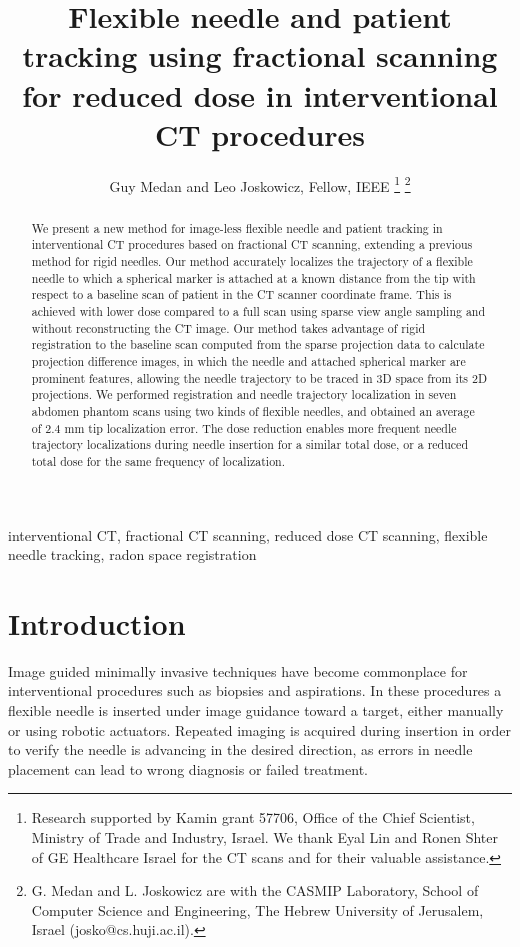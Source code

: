 \documentclass[letterpaper, 11 pt, conference]{ieeeconf} %
\title{\LARGE \bf
Flexible needle and patient tracking using fractional scanning for reduced dose in interventional CT procedures
}
\author{Guy Medan and Leo Joskowicz, Fellow, IEEE%
\thanks{Research supported by Kamin grant 57706, Office of the Chief Scientist, Ministry of Trade and Industry, Israel. We thank Eyal Lin and Ronen Shter of GE Healthcare Israel for the CT scans and for their valuable assistance.}%
\thanks{G. Medan and L. Joskowicz are with the CASMIP Laboratory, School of Computer Science and Engineering, The Hebrew University of Jerusalem, Israel (josko@cs.huji.ac.il).}%
}
\begin{document}
\maketitle
\thispagestyle{plain}
\pagestyle{plain}


\begin{abstract}
We present a new method for image-less flexible needle and patient tracking in interventional CT procedures based on fractional CT scanning, extending a previous method for rigid needles.
Our method accurately localizes the trajectory of a flexible needle to which a spherical marker is attached at a known distance from the tip with respect to a baseline scan of patient in the CT scanner coordinate frame. 
This is achieved with lower dose compared to a full scan using sparse view angle sampling and without reconstructing the CT image.
Our method takes advantage of rigid registration to the baseline scan computed from the sparse projection data to calculate projection difference images, in which the needle and attached spherical marker are prominent features, allowing the needle trajectory to be traced in 3D space from its 2D projections.
We performed registration and needle trajectory localization in seven abdomen phantom scans using two kinds of flexible needles, and obtained an average of 2.4 mm tip localization error.
The dose reduction enables more frequent needle trajectory localizations during needle insertion for a similar total dose, or a reduced total dose for the same frequency of localization.

\end{abstract}

\begin{keywords}
interventional CT, fractional CT scanning, reduced dose CT scanning, flexible needle tracking, radon space registration 
\end{keywords}

\section{Introduction}

Image guided minimally invasive techniques have become commonplace for interventional procedures such as biopsies and aspirations.
In these procedures a flexible needle is inserted under image guidance toward a target, either manually or using robotic actuators. Repeated imaging is acquired during insertion in order to verify the needle is advancing in the desired direction, as errors in needle placement can lead to wrong diagnosis or failed treatment.
\end{document}
